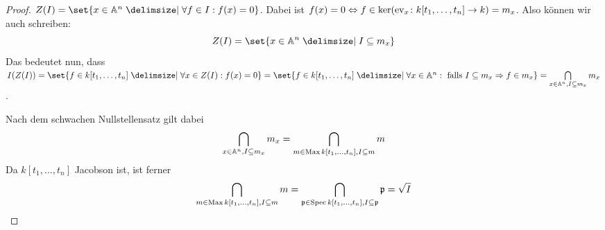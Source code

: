 \documentclass[12pt,a4paper]{scrartcl}
\theoremstyle{cplain}
\theoremstyle{cdef}
\begin{document}
\begin{proof}
	$Z(I) = \set{x\in\IA^n\given \forall f\in I: f(x) = 0}$. Dabei ist $f(x) = 0\Leftrightarrow f\in \operatorname{ker}(\operatorname{ev}_x\colon k[t_1,\dots, t_n]\to k) = m_x$. Also können wir auch schreiben:
	$$Z(I) = \set{x\in\IA^n\given I\subseteq m_x}$$
	Das bedeutet nun, dass $I(Z(I)) = \set{f\in k[t_1,\dots, t_n]\given \forall x \in Z(I): f(x) = 0} = \set{f\in k[t_1,\dots, t_n] \given \forall x\in\IA^n: \text{ falls }I\subseteq m_x\Rightarrow f\in m_x} = \bigcap\limits_{x\in\IA^n, I\subseteq m_x}m_x$.
	
	Nach dem schwachen Nullstellensatz gilt dabei
	$$\bigcap\limits_{x\in\mathbb A^n, I\subseteq m_x}m_x = \bigcap\limits_{m\in \operatorname{Max} k[t_1,\dots, t_n], I\subseteq m} m$$
	Da $k[t_1,\dots, t_n]$ Jacobson ist, ist ferner
	$$\bigcap\limits_{m\in \operatorname{Max} k[t_1,\dots, t_n], I\subseteq m} m = \bigcap\limits_{\mathfrak{p}\in\operatorname{Spec} k[t_1,\dots, t_n], I\subseteq \mathfrak{p}} \mathfrak{p} = \sqrt{I}$$
\end{proof}
\end{document}
